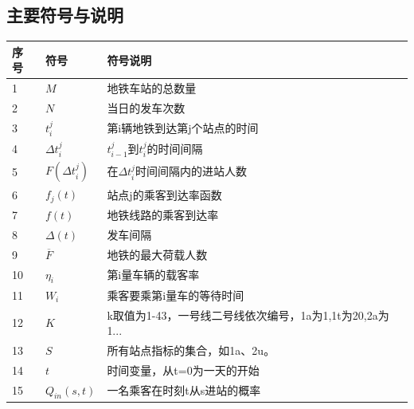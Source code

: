 \documentclass[12pt,a4paper]{mcmthesis}
\newcommand{\headcol}{\rowcolor{tableheadcolor}}
\begin{document}
    \subsection{主要符号与说明}
    \begin{table}[h]
        \centering
        \small
        \begin{tabular}{p{60pt}<{\centering}|p{60pt}<{\centering}p{180pt}<{\raggedright}}
            \hline
            \headcol 序号 & 符号                  & 符号说明                                   \\
            \hline
            1           & $M$                 & 地铁车站的总数量                               \\
            2           & $N$                 & 当日的发车次数                                \\
            3           & $t_{i}^{j}$         & 第i辆地铁到达第j个站点的时间                        \\
            4           & $\Delta {t_i^j}$    & $t_{i-1}^{j}$到$t_i^j$的时间间隔             \\
            5           & $F(\Delta {t_i^j})$ & 在$\Delta t_i^j$时间间隔内的进站人数              \\
            6           & $f_j(t)$            & 站点j的乘客到达率函数                            \\
            7           & ${f(t)}$            & 地铁线路的乘客到达率                             \\
            8           & $\Delta(t)$         & 发车间隔                                   \\
            9           & $\overline{F}$      & 地铁的最大荷载人数                              \\
            10          & $\eta_i$            & 第i量车辆的载客率                              \\
            11          & $W_i$               & 乘客要乘第i量车的等待时间                          \\
            12          & $K$                 & k取值为1-43，一号线二号线依次编号，1a为1,1t为20,2a为1... \\
            13          & $S$                 & 所有站点指标的集合，如1a、2u。                      \\
            14          & $t$                 & 时间变量，从t=0为一天的开始                        \\
            15          & $Q_{in}(s,t)$       & 一名乘客在时刻t从s进站的概率                        \\

\end{tabular}
\end{table}
\end{document}
